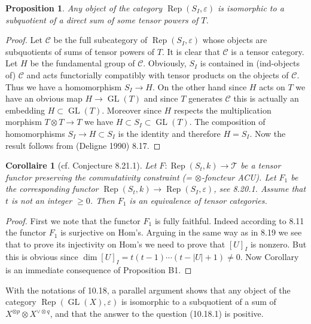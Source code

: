 \documentclass[11pt,a4paper]{article}
\theoremstyle{plain}
\newtheorem{proposition}[theorem]{Proposition}
\newtheorem{corollary}[theorem]{Corollaire}
\theoremstyle{definition}
\DeclareMathOperator{\Rep}{Rep}
\DeclareMathOperator{\GL}{GL}
\newcommand{\eps}{\varepsilon}
\begin{document}
\begin{proposition}
Any object of the category $\Rep(S_I, \eps)$ is isomorphic to a subquotient of a direct sum of some tensor powers of $T$.
\end{proposition}

\begin{proof}
Let $\mathcal{C}$ be the full subcategory of $\Rep(S_I, \eps)$ whose objects are subquotients of sums of tensor powers of $T$. It is clear that $\mathcal{C}$ is a tensor category. Let $H$ be the fundamental group of $\mathcal{C}$. Obviously, $S_I$ is contained in (ind-objects of) $\mathcal{C}$ and acts functorially compatibly with tensor products on the objects of $\mathcal{C}$. Thus we have a homomorphism $S_I \to H$. On the other hand since $H$ acts on $T$ we have an obvious map $H \to \GL(T)$ and since $T$ generates $\mathcal{C}$ this is actually an embedding $H \subset \GL(T)$. Moreover since $H$ respects the multiplication morphism $T \otimes T \to T$ we have $H \subset S_I \subset \GL(T)$. The composition of homomorphisms $S_I \to H \subset S_I$ is the identity and therefore $H = S_I$. Now the result follows from (Deligne 1990) 8.17.
\end{proof}

\begin{corollary}[cf. Conjecture 8.21.1]
Let $F : \Rep(S_t, k) \to \mathcal{T}$ be a tensor functor preserving the commutativity constraint (= $\otimes$-foncteur ACU). Let $F_1$ be the corresponding functor $\Rep(S_t, k) \to \Rep(S_I, \eps)$, see 8.20.1. Assume that $t$ is not an integer $\geq 0$. Then $F_1$ is an equivalence of tensor categories.
\end{corollary}

\begin{proof}
First we note that the functor $F_1$ is fully faithful. Indeed according to 8.11 the functor $F_1$ is surjective on Hom's. Arguing in the same way as in 8.19 we see that to prove its injectivity on Hom's we need to prove that $[U]_I$ is nonzero. But this is obvious since $\dim [U]_I = t(t-1)\cdots(t-|U|+1) \neq 0$. Now Corollary is an immediate consequence of Proposition B1.
\end{proof}

With the notations of 10.18, a parallel argument shows that any object of the category $\Rep(\GL(X), \eps)$ is isomorphic to a subquotient of a sum of $X^{\otimes p} \otimes X^{\vee \otimes q}$, and that the answer to the question (10.18.1) is positive.
\end{document}
